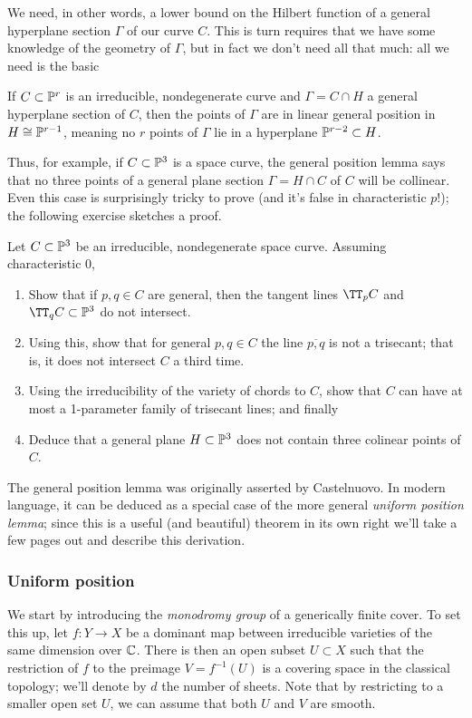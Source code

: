 We need, in other words, a lower bound on the Hilbert function of a general hyperplane section $\Gamma$ of our curve $C$. This is turn requires that we have some knowledge of the geometry of $\Gamma$, but  in fact we don't need all that much: all we need is the basic

\begin{lemma}\label{general position lemma}
If $C \subset \PP^r$ is an irreducible, nondegenerate curve and $\Gamma = C \cap H$ a general hyperplane section of $C$, then the points of $\Gamma$ are in linear general position in $H \cong \PP^{r-1}$, meaning no $r$ points of $\Gamma$ lie in a hyperplane $\PP^{r-2} \subset H$.
\end{lemma}

Thus, for example, if $C \subset \PP^3$ is a space curve, the general position lemma says that no three points of a general plane section $\Gamma = H \cap C$ of $C$ will be collinear. Even this case is surprisingly tricky to prove (and it's false in characteristic $p$!); the following exercise sketches a proof.

\begin{exercise}
Let $C \subset \PP^3$ be an irreducible, nondegenerate space curve. Assuming characteristic 0,
\begin{enumerate}
\item Show that if $p, q \in C$ are general, then the tangent lines $\TT_pC$ and $\TT_qC \subset \PP^3$ do not intersect.
\item Using this, show that for general $p, q \in C$ the line $\overline{p,q}$ is not a trisecant; that is, it does not intersect $C$ a third time.
\item Using the irreducibility of the variety of chords to $C$, show that $C$ can have at most a 1-parameter family of trisecant lines; and finally
\item Deduce that a general plane $H \subset \PP^3$ does not contain three colinear points of $C$.
\end{enumerate}
\end{exercise}

The general position lemma was originally asserted by Castelnuovo. In modern language, it can be deduced as a special case of the more general \emph{uniform position lemma}; since this is a useful (and beautiful) theorem in its own right we'll take a few pages out and describe this derivation.

\subsubsection{Uniform position} We start by introducing the \emph{monodromy group} of a generically finite cover. To set this up, let $f : Y \to X$ be a dominant map between irreducible varieties of the same dimension over $\CC$. There is then an open subset $U \subset X$ such that the restriction of $f$ to the preimage $V = f^{-1}(U)$ is a covering space in the classical topology; we'll denote by $d$ the number of sheets. Note that by restricting to a smaller open set $U$, we can assume that both $U$ and $V$ are smooth.

